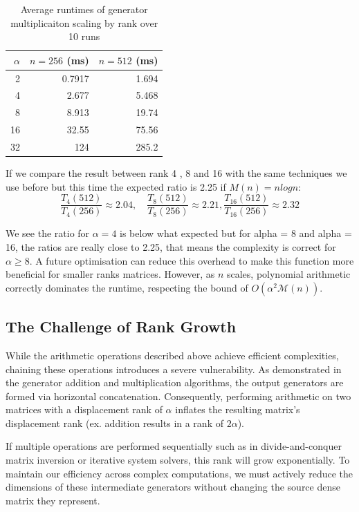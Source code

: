 \begin{table}[htpb]
  \centering
  \begin{tabular}{r r r}
    \hline
    $\alpha$ & $n=256$ (ms) & $n=512$ (ms) \\
    \hline
    2        & 0.7917       & 1.694 \\
    4        & 2.677        & 5.468 \\
    8        & 8.913        & 19.74 \\
    16       & 32.55        & 75.56 \\
    32       & 124          & 285.2 \\
    \hline
  \end{tabular}
  \caption{Average runtimes of generator multiplicaiton scaling by
  rank over 10 runs}
  \label{tab:bench_mul_rank}
\end{table}

If we compare the result between rank 4 , 8 and 16 with the same
techniques we use before but this time the expected ratio is 2.25 if
$M(n) =nlogn$:
$$ \frac{T_4(512)}{T_4(256)} \approx 2.04, \quad \frac{T_8(512)}{T_8(256)}
\approx 2.21,\frac{T_{16}(512)}{T_{16}(256)} \approx 2.32 $$

We see the ratio for $\alpha = 4$ is below what expected but for
alpha = 8 and alpha = 16, the ratios are really close to 2.25, that
means the complexity is correct for $\alpha \geq 8$.
A future optimisation can reduce this overhead
to make this function more beneficial for smaller ranks matrices.
However, as $n$ scales,
polynomial arithmetic correctly dominates the runtime, respecting the bound of
$O(\alpha^2 \mathcal{M}(n))$.

\subsection{The Challenge of Rank Growth}

While the arithmetic operations described above achieve
efficient complexities, chaining these
operations introduces a severe vulnerability. As
demonstrated in the generator addition and multiplication algorithms,
the output generators are formed via horizontal concatenation.
Consequently, performing arithmetic on two matrices with a
displacement rank of $\alpha$ inflates the resulting
matrix's displacement rank (ex. addition results in a rank of $2\alpha$).

If multiple operations are performed sequentially such as in
divide-and-conquer matrix inversion or iterative system solvers, this
rank will grow exponentially. To maintain our
efficiency across complex computations, we must actively reduce the
dimensions of these intermediate generators without changing the
source dense matrix they represent.
